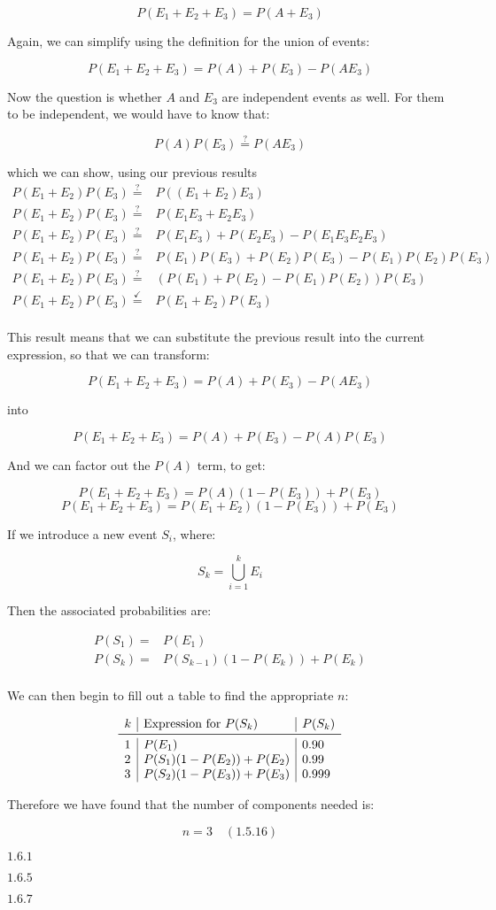 \documentclass{article}
\newcommand{\problem}[2]{$\boxed{\text{#1.#2}}$}
\newcommand{\solution}[3]{\boxed{#3\quad(\text{#1.#2})}}
\begin{document}
\[
P(E_1+E_2+E_3)=P(A+E_3)
\]

Again, we can simplify using the definition for the union of events:

\[
P(E_1+E_2+E_3)=P(A)+P(E_3)-P(AE_3)
\]

Now the question is whether $A$ and $E_3$ are independent events as
well. For them to be independent, we would have to know that:

\[
P(A)P(E_3)\overset{?}{=}P(AE_3)
\]

which we can show, using our previous results
\[
\begin{array}{rl}
P(E_1+E_2)P(E_3)\overset{?}{=} &
P((E_1+E_2)E_3) \\
P(E_1+E_2)P(E_3)\overset{?}{=} &
P(E_1E_3+E_2E_3) \\
P(E_1+E_2)P(E_3)\overset{?}{=} &
P(E_1E_3)+P(E_2E_3)-P(E_1E_3E_2E_3) \\
P(E_1+E_2)P(E_3)\overset{?}{=} &
P(E_1)P(E_3)+P(E_2)P(E_3)-P(E_1)P(E_2)P(E_3) \\
P(E_1+E_2)P(E_3)\overset{?}{=} &
(P(E_1)+P(E_2)-P(E_1)P(E_2))P(E_3) \\
P(E_1+E_2)P(E_3)\overset{\checkmark}{=} &
P(E_1+E_2)P(E_3) \\
\end{array}
\]

This result means that we can substitute the previous result into the
current expression, so that we can transform:

\[
P(E_1+E_2+E_3)=P(A)+P(E_3)-P(AE_3)
\]

into

\[
P(E_1+E_2+E_3)=P(A)+P(E_3)-P(A)P(E_3)
\]

And we can factor out the $P(A)$ term, to get:

\[
P(E_1+E_2+E_3)=P(A)(1-P(E_3))+P(E_3)
\] \[
P(E_1+E_2+E_3)=P(E_1+E_2)(1-P(E_3))+P(E_3)
\]

If we introduce a new event $S_i$, where:

\[
S_k=\bigcup\limits_{i=1}^kE_i
\]

Then the associated probabilities are:

\[
\begin{array}{rl}
P(S_1)= & P(E_1)\\
P(S_k)= & P(S_{k-1})(1-P(E_k))+P(E_k) \\
\end{array}
\]

We can then begin to fill out a table to find the appropriate $n$:

\[
\begin{array}{l|l|l}
k & \text{Expression for $P(S_k)$} & P(S_k) \\
\midrule
1 & P(E_1) & 0.90 \\
2 & P(S_1)(1-P(E_2))+P(E_2) & 0.99 \\
3 & P(S_2)(1-P(E_3))+P(E_3) & 0.999 \\
\end{array}
\]

Therefore we have found that the number of components needed is:

\[
\solution{1.5}{16}{n=3}
\]

\problem{1.6}{1}




\problem{1.6}{5}




\problem{1.6}{7}
\end{document}
